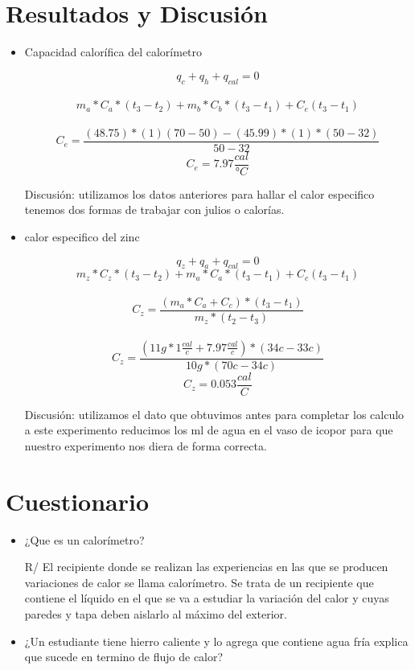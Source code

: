 \documentclass{article}
\begin{document}
\begin{multicols}{2}
\section{Resultados y Discusión}



\begin{itemize}
    \item Capacidad calorífica  del calorímetro
    
    $$q_{c}+q_{h}+q_{cal}=0$$
   \\ $$m_{a}*C_{a}*(t_{3}-t_{2})+m_{b}*C_{b}*(t_{3}-t_{1})+C_{e}(t_{3}-t_{1})$$
   \\ $$ C_{e}=\frac{(48.75)*(1 ) (70-50)-(45.99 )*(1)*(50-32)}{50-32}$$
    $$C_{e}=7.97 \frac{cal}{°C}$$
    
    Discusión: utilizamos los datos anteriores para hallar el calor especifico tenemos dos formas de trabajar con julios o calorías.
    
    \item calor especifico  del zinc
    
     $$q_{z}+q_{a}+q_{cal}=0$$
    $$m_{z}*C_{z}*(t_{3}-t_{2})+m_{a}*C_{a}*(t_{3}-t_{1})+C_{c}(t_{3}-t_{1})$$
  \\ $$C_{z}=\frac{(m_{a}*C_{a}+C_{c})*(t_{3}-t_{1})}{m_{z}*(t_{2}-t_{3})}$$
   \\$$C_{z}=\frac{(11g * 1\frac{cal}{c}+7.97 \frac{cal}{c})*(34c-33c)}{10g *(70c-34c)}$$
   $$ C_{z}= 0.053 \frac{cal}{C}$$
   
   Discusión: utilizamos el dato que obtuvimos antes para completar los calculo a este experimento reducimos los ml de agua en el vaso de icopor para que nuestro experimento nos diera de forma correcta.
\end{itemize}

\section*{Cuestionario}

\begin{itemize}
    \item ¿Que es un calorímetro?
    
    R/ El recipiente donde se realizan las experiencias en las que se producen variaciones de calor se llama calorímetro. Se trata de un recipiente que contiene el líquido en el que se va a estudiar la variación del calor y cuyas paredes y tapa deben aislarlo al máximo del exterior.
    
    \item ¿Un estudiante tiene hierro caliente y lo agrega que contiene agua fría explica que sucede en termino de flujo de calor?
    

\end{itemize}
\end{multicols}
\end{document}
